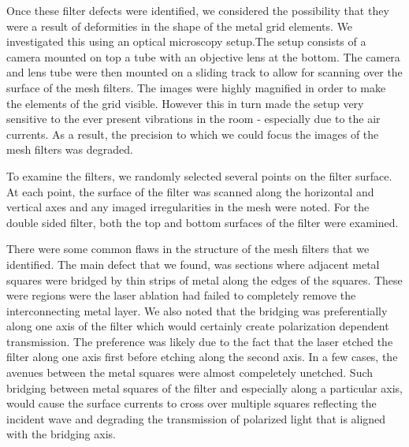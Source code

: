 \documentclass[12pt]{article}
\begin{document}
Once these filter defects were identified, we considered the possibility that they were a result of deformities in the shape of the metal grid elements. We investigated this using an optical microscopy setup.The setup consists of a camera mounted on top a tube with an objective lens at the bottom. The camera and lens tube were then mounted on a sliding track to allow for scanning over the surface of the mesh filters. The images were highly magnified in order to make the elements of the grid visible. However this in turn made the setup very sensitive to the ever present vibrations in the room - especially due to the air currents. As a result, the precision to which we could focus the images of the mesh filters was degraded.

To examine the filters, we randomly selected several points on the filter surface. At each point, the surface of the filter was scanned along the horizontal and vertical axes and any imaged irregularities in the mesh were noted. For the  double sided filter, both the top and bottom surfaces of the filter were examined. 


There were some common flaws in the structure of the mesh filters that we identified. The main defect that we found, was  sections where adjacent metal squares were bridged by thin strips of metal along the edges of the squares. These were regions were the laser ablation had failed to completely remove the interconnecting metal layer. We also noted that the bridging was preferentially along one axis of the filter which would certainly create polarization dependent transmission. The preference was likely due to the fact that the laser etched the filter along one axis first before etching along the second axis. In a few cases, the avenues between the metal squares were almost compeletely unetched. Such bridging between metal squares of the filter and especially along a particular axis, would cause the surface currents to cross over multiple squares reflecting the incident wave and degrading the transmission of polarized light that is aligned with the bridging axis.
\end{document}
